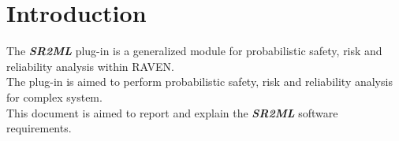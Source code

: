 \section{Introduction}
The \textbf{\textit{SR2ML}} plug-in is a generalized module for probabilistic safety, risk and reliability analysis within RAVEN.
\\The plug-in is aimed to perform probabilistic safety, risk and reliability analysis for complex system.
\\This document is aimed to report and explain the  \textbf{\textit{SR2ML}} software requirements.
